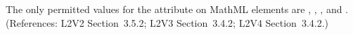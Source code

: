 The only permitted values for the  attribute on MathML
 elements are , , , and
.  (References: L2V2 Section~3.5.2; L2V3 Section~3.4.2; L2V4 Section~3.4.2.)
